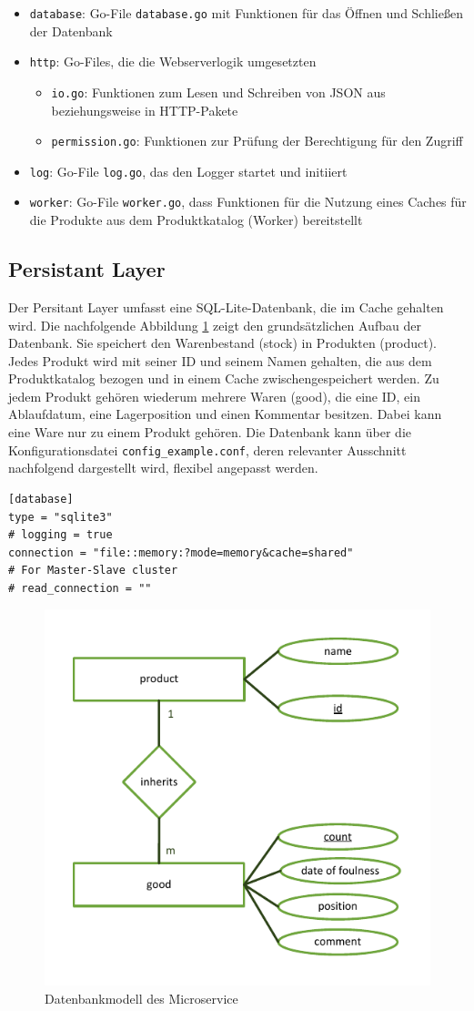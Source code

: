 	\begin{itemize}
	\item \texttt{database}: Go-File \texttt{database.go} mit Funktionen für das Öffnen und Schließen der Datenbank
	\item \texttt{http}: Go-Files, die die Webserverlogik umgesetzten
		\begin{itemize}
		\item \texttt{io.go}: Funktionen zum Lesen und Schreiben von JSON aus beziehungsweise in HTTP-Pakete
		\item \texttt{permission.go}: Funktionen zur Prüfung der Berechtigung für den Zugriff
		\end{itemize}	
	\item \texttt{log}: Go-File \texttt{log.go}, das den Logger startet und initiiert
	\item \texttt{worker}: Go-File \texttt{worker.go}, dass Funktionen für die Nutzung eines Caches für die Produkte aus dem Produktkatalog (Worker) bereitstellt 
	\end{itemize}


\subsection{Persistant Layer}
Der Persitant Layer umfasst eine SQL-Lite-Datenbank, die im Cache gehalten wird. Die nachfolgende Abbildung \ref{pic:Datenbankmodell des Microservice} zeigt den grundsätzlichen Aufbau der Datenbank. Sie speichert den Warenbestand (stock) in Produkten (product). Jedes Produkt wird mit seiner ID und seinem Namen gehalten, die aus dem Produktkatalog bezogen und in einem Cache zwischengespeichert werden. Zu jedem Produkt gehören wiederum mehrere Waren (good), die eine ID, ein Ablaufdatum, eine Lagerposition und einen Kommentar besitzen. Dabei kann eine Ware nur zu einem Produkt gehören. Die Datenbank kann über die Konfigurationsdatei \texttt{config\_example.conf}, deren relevanter Ausschnitt nachfolgend dargestellt wird, flexibel angepasst werden.


\begin{lstlisting}[caption=Datenbankeinstellungen in der Konfigurationsdatei]
[database]
type = "sqlite3"
# logging = true
connection = "file::memory:?mode=memory&cache=shared"
# For Master-Slave cluster
# read_connection = ""
\end{lstlisting}

\begin{figure}[H]
	\centering
	\includegraphics[width=0.40 \textwidth]{./pics/db.pdf}
	\caption{Datenbankmodell des Microservice}
	\label{pic:Datenbankmodell des Microservice}
\end{figure}

